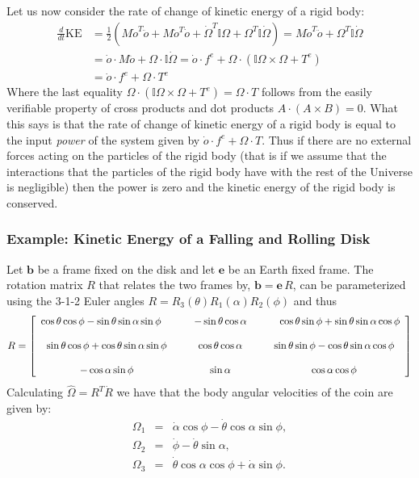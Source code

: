\documentclass[graybox,envcountchap,sectrefs]{svmonoMuga}
\begin{document}
Let us now consider the rate of change of kinetic energy of a rigid body:
\begin{align}
\frac{d }{dt}\mathrm{KE}&=\frac{1}{2}\left(M\dot{o}^T\ddot{o}+
M\ddot{o}^T\dot{o}+{\dot{\Omega}^T \mathbb{I}{\Omega}+\Omega^T \mathbb{I}\dot{\Omega}}\right)
=M\dot{o}^T\ddot{o}+\Omega^T \mathbb{I}\dot{\Omega}\nonumber\\
&=\dot{o}\cdot M\ddot{o}+\Omega \cdot \mathbb{I}\dot{\Omega}=\dot{o}\cdot f^e+\Omega 
\cdot (\mathbb{I}{\Omega}\times \Omega+T^e)\nonumber\\
&=\dot{o}\cdot f^e+\Omega \cdot T^e\label{eq:RateOfKE}
\end{align}
Where the last equality $\Omega \cdot (\mathbb{I}{\Omega}\times \Omega+T^e)=\Omega \cdot T$ follows from the easily verifiable property
of cross products and dot products
$
A \cdot (A \times B) = 0.
$
What this says is that the rate of change of kinetic energy of a rigid body is equal to the input \textit{power} of the system given by $\dot{o}\cdot f^e+\Omega \cdot T$. Thus if there are no external forces acting on the particles of the rigid body (that is if we assume that the interactions that the particles of the rigid body have with the rest of the Universe is negligible) then the power is zero and the kinetic energy of the rigid body is conserved.

\subsubsection*{Example: Kinetic Energy of a Falling and Rolling Disk}\label{Secn:FallingRollingDisk}
Let $\mathbf{b}$ be a frame fixed on the disk and let $\mathbf{e}$ be an Earth fixed frame. The rotation matrix $R$ that relates the two frames by, $\mathbf{b}=\mathbf{e}\,R$, can be parameterized using the 3-1-2 Euler 
angles $R=R_3(\theta)R_1(\alpha)R_2(\phi)$ and thus
{\small
\[R=
\left[ \begin {array}{ccc} \cos \theta \cos \phi -\sin \theta \sin \alpha \sin \phi \:\:\:\:\:&\:\:\:\:\:-\sin \theta \cos \alpha \:\:\:\:\:&\:\:\:\:\:\cos \theta \sin \phi +\sin \theta \sin \alpha \cos \phi \\
\noalign{\bigskip}\sin \theta \cos \phi +\cos \theta \sin \alpha \sin \phi &\cos \theta \cos \alpha &\sin \theta \sin \phi -\cos \theta \sin \alpha \cos \phi \\\noalign{\bigskip}-\cos \alpha \sin \phi 
&\sin \alpha &\cos \alpha \cos \phi \end {array} \right]
\]
}
Calculating $\widehat{\Omega}=R^T\dot{R}$ we have that
the body angular velocities of the coin are given by:
\begin{eqnarray}
{\Omega}_1 & = & \dot{\alpha}\cos{\phi}-\dot{\theta}\cos{\alpha}\sin{\phi}, \label{eq:CoinBodyAngVel1}\\
{\Omega}_2 & = & \dot{\phi}-\dot{\theta}\sin{\alpha}, \label{eq:CoinBodyAngVel2}\\
{\Omega}_3 & = & \dot{\theta}\cos{\alpha}\cos{\phi}+\dot{\alpha}\sin{\phi}. \label{eq:CoinBodyAngVel3}
\end{eqnarray}
\end{document}
